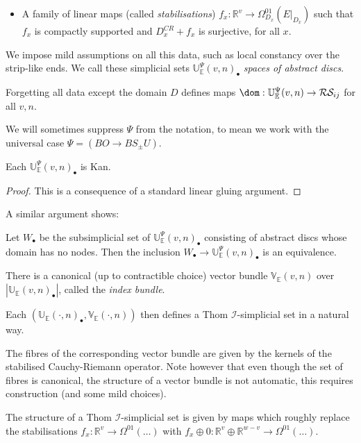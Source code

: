 \documentclass{TPmod}
\def\bE{\mathbb{E}}
\def\bR{\mathbb{R}}
\def\bU{\mathbb{U}}
\def\bV{\mathbb{V}}
\newcommand{\cI}{\mathcal{I}}
\newcommand{\cR}{\mathcal{R}}
\newcommand{\cS}{\mathcal{S}}
\numberwithin{equation}{section}
\begin{document}
\begin{defn}
\begin{itemize}
    
            \item A family of linear maps (called \emph{stabilisations}) $f_x: \bR^v \to \Omega^{01}_{D_x} (E|_{D_x})$ such that $f_x$ is compactly supported and $D^{CR}_x + f_x$ is surjective, for all $x$.

            
        \end{itemize}
    
        We impose mild assumptions on all this data, such as local constancy over the strip-like ends. We call these simplicial sets $\bU_{\bE}^{\Psi}(v,n)_\bullet$ \emph{spaces of abstract discs}.
    \end{defn}

    Forgetting all data except the domain $D$ defines maps $\dom: \bU^\Psi_{\bE}(v,n) \to \cR\cS_{ij}$ for all $v,n$.
 
\begin{rmk}
We will sometimes suppress $\Psi$ from the notation, to mean we work with the universal case $\Psi = (BO \to BS_\pm U)$. 
\end{rmk}

    \begin{lem}
        Each $\bU^\Psi_{\bE}(v, n)_\bullet$ is Kan. 
    \end{lem}
    \begin{proof}
        This is a consequence of a standard linear gluing argument.
    \end{proof}
    A similar argument shows:
    \begin{lem}
        Let $W_\bullet$ be the subsimplicial set of $\bU^\Psi_{\bE}(v, n)_\bullet$ consisting of abstract discs whose domain has no nodes. Then the inclusion $W_\bullet \to \bU^\Psi_{\bE}(v, n)_\bullet$ is an equivalence.
    \end{lem}

    
   

    \begin{lem}[{\cite[Lemma 3.18]{PS2}}]
        There is a canonical (up to contractible choice) vector bundle $\bV_{\bE}(v,n)$ over $|\bU_{\bE}(v,n)_\bullet|$, called the \emph{index bundle}.

        Each $(\bU_{\bE}(\cdot, n)_\bullet, \bV_{\bE}(\cdot, n))$ then defines a Thom $\cI$-simplicial set in a natural way. 
        
    \end{lem}
    \begin{rmk}\label{rmk: vect}
        The fibres of the corresponding vector bundle are given by the kernels of the stabilised Cauchy-Riemann operator. Note however that even though the set of fibres is canonical, the structure of a vector bundle is not automatic, this requires construction (and some mild choices).

        The structure of a Thom $\cI$-simplicial set is given by maps which roughly replace the stabilisations $f_x: \bR^v \to \Omega^{01}(\ldots)$ with $f_x \oplus 0: \bR^v \oplus \bR^{w-v} \to \Omega^{01}(\ldots)$.
    \end{rmk}
\end{document}
